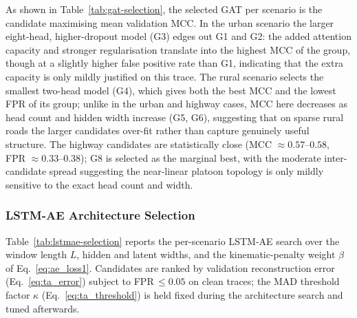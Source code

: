 \documentclass[12pt, a4paper]{report}
\begin{document}
As shown in Table~\ref{tab:gat-selection}, the selected GAT per scenario is the
candidate maximising mean validation MCC. In the urban scenario the larger
eight-head, higher-dropout model (G3) edges out G1 and G2: the added attention
capacity and stronger regularisation translate into the highest MCC of the
group, though at a slightly higher false positive rate than G1, indicating that
the extra capacity is only mildly justified on this trace. The rural scenario
selects the smallest two-head model (G4), which gives both the best MCC and
the lowest FPR of its group; unlike in the urban and highway cases, MCC here
decreases as head count and hidden width increase (G5, G6), suggesting that on
sparse rural roads the larger candidates over-fit rather than capture genuinely
useful structure. The highway candidates are statistically close (MCC
$\approx 0.57$--$0.58$, FPR $\approx 0.33$--$0.38$); G8 is selected as the
marginal best, with the moderate inter-candidate spread suggesting the
near-linear platoon topology is only mildly sensitive to the exact head count
and width.

\subsubsection{LSTM-AE Architecture Selection}

Table~\ref{tab:lstmae-selection} reports the per-scenario LSTM-AE search over the
window length $L$, hidden and latent widths, and the kinematic-penalty weight
$\beta$ of Eq.~\ref{eq:ae_loss1}. Candidates are ranked by validation
reconstruction error (Eq.~\ref{eq:ta_error}) subject to FPR$\,\leq 0.05$ on clean
traces; the MAD threshold factor $\kappa$ (Eq.~\ref{eq:ta_threshold}) is held
fixed during the architecture search and tuned afterwards.
\end{document}
